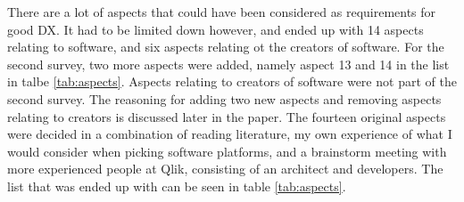 \documentclass{cslthse-msc}
\begin{document}
    There are a lot of aspects that could have been considered as requirements for
    good DX. It had to be limited down however, and ended up with 14 aspects relating to software, and six aspects relating ot the
    creators of software.
    For the second survey, two more aspects were added, namely aspect 13 and 14 in the list in talbe \ref{tab:aspects}. Aspects relating to
    creators of software were not part of the second survey.
    The reasoning for adding two new aspects and removing aspects relating to creators is
    discussed later in the paper. The fourteen original aspects were decided in a combination
    of reading literature, my own experience of what I would consider when
    picking software platforms, and a brainstorm meeting with more experienced
    people at Qlik, consisting of an architect and developers.
    The list that was ended up with can be seen in table \ref{tab:aspects}.
\end{document}
